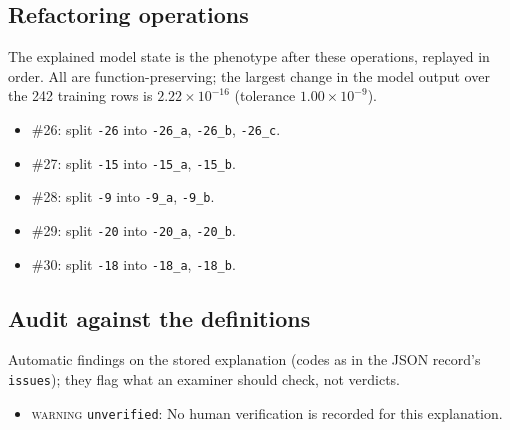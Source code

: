 \begin{drafted}
\subsection{Refactoring operations}\label{app:heart-s2-c1:operations}
The explained model state is the phenotype after these operations, replayed in order. All are function-preserving; the largest change in the model output over the 242 training rows is $2.22\times 10^{-16}$ (tolerance $1.00\times 10^{-9}$).
\begin{itemize}
\item \#26: split \texttt{-26} into \texttt{-26\_\allowbreak{}a}, \texttt{-26\_\allowbreak{}b}, \texttt{-26\_\allowbreak{}c}.
\item \#27: split \texttt{-15} into \texttt{-15\_\allowbreak{}a}, \texttt{-15\_\allowbreak{}b}.
\item \#28: split \texttt{-9} into \texttt{-9\_\allowbreak{}a}, \texttt{-9\_\allowbreak{}b}.
\item \#29: split \texttt{-20} into \texttt{-20\_\allowbreak{}a}, \texttt{-20\_\allowbreak{}b}.
\item \#30: split \texttt{-18} into \texttt{-18\_\allowbreak{}a}, \texttt{-18\_\allowbreak{}b}.
\end{itemize}
\subsection{Audit against the definitions}\label{app:heart-s2-c1:audit}
Automatic findings on the stored explanation (codes as in the JSON record's \texttt{issues}); they flag what an examiner should check, not verdicts.
\begin{itemize}
\item \textsc{warning} \texttt{unverified}: No human verification is recorded for this explanation.
\end{itemize}
\end{drafted}
